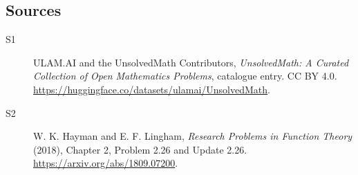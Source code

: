 \documentclass[11pt]{article}
\begin{document}
\subsection{Sources}
\begin{description}
\item[\hypertarget{source:statement:1}{S1}] ULAM.AI and the UnsolvedMath Contributors, \emph{UnsolvedMath: A Curated Collection of Open Mathematics Problems}, catalogue entry. CC BY 4.0. \url{https://huggingface.co/datasets/ulamai/UnsolvedMath}.
\item[\hypertarget{source:statement:2}{S2}] W. K. Hayman and E. F. Lingham, \emph{Research Problems in Function Theory} (2018), Chapter 2, Problem 2.26 and Update 2.26. \url{https://arxiv.org/abs/1809.07200}.
\end{description}
\label{end:statement}
\end{document}
